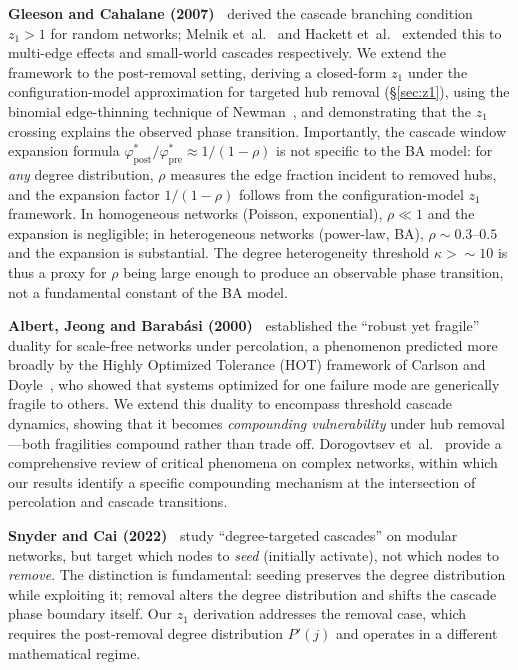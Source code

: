 \documentclass[aps,pre,twocolumn,superscriptaddress,showpacs]{revtex4-2}
\begin{document}
\textbf{Gleeson and Cahalane (2007)~\cite{Gleeson2007}} derived the cascade branching condition $z_1 > 1$ for random networks; Melnik et~al.~\cite{Melnik2013} and Hackett et~al.~\cite{Hackett2011} extended this to multi-edge effects and small-world cascades respectively. We extend the framework to the post-removal setting, deriving a closed-form $z_1$ under the configuration-model approximation for targeted hub removal (\S\ref{sec:z1}), using the binomial edge-thinning technique of Newman~\cite{Newman2002}, and demonstrating that the $z_1$ crossing explains the observed phase transition. Importantly, the cascade window expansion formula $\varphi^*_{\mathrm{post}}/\varphi^*_{\mathrm{pre}} \approx 1/(1-\rho)$ is not specific to the BA model: for \emph{any} degree distribution, $\rho$ measures the edge fraction incident to removed hubs, and the expansion factor $1/(1-\rho)$ follows from the configuration-model $z_1$ framework. In homogeneous networks (Poisson, exponential), $\rho \ll 1$ and the expansion is negligible; in heterogeneous networks (power-law, BA), $\rho \sim 0.3$--$0.5$ and the expansion is substantial. The degree heterogeneity threshold $\kappa > {\sim}10$ is thus a proxy for $\rho$ being large enough to produce an observable phase transition, not a fundamental constant of the BA model.

\textbf{Albert, Jeong and Barab\'asi (2000)~\cite{Albert2000}} established the ``robust yet fragile'' duality for scale-free networks under percolation, a phenomenon predicted more broadly by the Highly Optimized Tolerance (HOT) framework of Carlson and Doyle~\cite{CarlsonDoyle2002}, who showed that systems optimized for one failure mode are generically fragile to others. We extend this duality to encompass threshold cascade dynamics, showing that it becomes \emph{compounding vulnerability} under hub removal---both fragilities compound rather than trade off. Dorogovtsev et~al.~\cite{Dorogovtsev2008} provide a comprehensive review of critical phenomena on complex networks, within which our results identify a specific compounding mechanism at the intersection of percolation and cascade transitions.

\textbf{Snyder and Cai (2022)~\cite{SnyderCai2022}} study ``degree-targeted cascades'' on modular networks, but target which nodes to \emph{seed} (initially activate), not which nodes to \emph{remove}. The distinction is fundamental: seeding preserves the degree distribution while exploiting it; removal alters the degree distribution and shifts the cascade phase boundary itself. Our $z_1$ derivation addresses the removal case, which requires the post-removal degree distribution $P'(j)$ and operates in a different mathematical regime.
\end{document}
